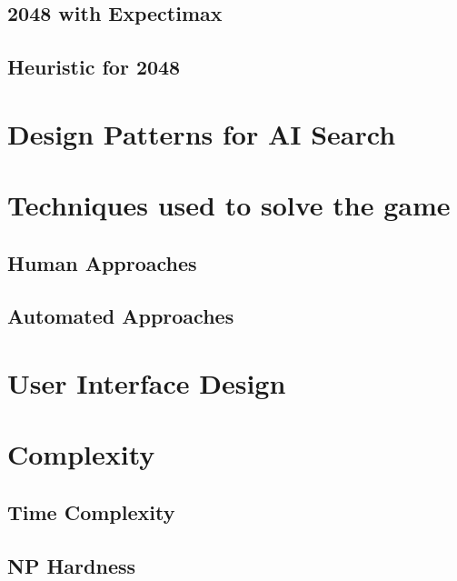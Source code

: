 \documentclass{article}
\begin{document}
\subsection{2048 with Expectimax}
\label{subsec:2048_expectimax}

\subsection{Heuristic for 2048}
\label{subsec:heuristic}

\section{Design Patterns for AI Search}
\label{sec:dp}

\section{Techniques used to solve the game}
\label{sec:techniques}

\subsection{Human Approaches}
\subsection{Automated Approaches}
\label{subsec:automated_techniques}

\section{User Interface Design}
\label{sec:ui}

\section{Complexity}
\label{sec:complexity}

\subsection{Time Complexity}
\label{subsec:time_comp}

\subsection{NP Hardness}
\label{subsec:np_hardness}



\end{document}
